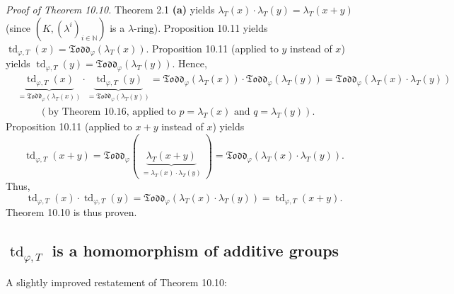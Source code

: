 \documentclass[numbers=enddot,12pt,final,onecolumn,notitlepage]{scrartcl}%
\begin{document}
\textit{Proof of Theorem 10.10.} Theorem 2.1 \textbf{(a)} yields $\lambda
_{T}\left(  x\right)  \cdot\lambda_{T}\left(  y\right)  =\lambda_{T}\left(
x+y\right)  $ (since $\left(  K,\left(  \lambda^{i}\right)  _{i\in\mathbb{N}%
}\right)  $ is a $\lambda$-ring). Proposition 10.11 yields $\operatorname*{td}%
_{\varphi,T}\left(  x\right)  =\mathfrak{Todd}_{\varphi}\left(  \lambda
_{T}\left(  x\right)  \right)  $. Proposition 10.11 (applied to $y$ instead of
$x$) yields $\operatorname*{td}_{\varphi,T}\left(  y\right)  =\mathfrak{Todd}%
_{\varphi}\left(  \lambda_{T}\left(  y\right)  \right)  $. Hence,%
\begin{align*}
&  \underbrace{\operatorname*{td}\nolimits_{\varphi,T}\left(  x\right)
}_{=\mathfrak{Todd}_{\varphi}\left(  \lambda_{T}\left(  x\right)  \right)
}\cdot\underbrace{\operatorname*{td}\nolimits_{\varphi,T}\left(  y\right)
}_{=\mathfrak{Todd}_{\varphi}\left(  \lambda_{T}\left(  y\right)  \right)
}=\mathfrak{Todd}_{\varphi}\left(  \lambda_{T}\left(  x\right)  \right)
\cdot\mathfrak{Todd}_{\varphi}\left(  \lambda_{T}\left(  y\right)  \right)
=\mathfrak{Todd}_{\varphi}\left(  \lambda_{T}\left(  x\right)  \cdot
\lambda_{T}\left(  y\right)  \right) \\
&  \ \ \ \ \ \ \ \ \ \ \left(  \text{by Theorem 10.16, applied to }%
p=\lambda_{T}\left(  x\right)  \text{ and }q=\lambda_{T}\left(  y\right)
\right)  .
\end{align*}
Proposition 10.11 (applied to $x+y$ instead of $x$) yields%
\[
\operatorname*{td}\nolimits_{\varphi,T}\left(  x+y\right)  =\mathfrak{Todd}%
_{\varphi}\left(  \underbrace{\lambda_{T}\left(  x+y\right)  }%
_{\substack{=\lambda_{T}\left(  x\right)  \cdot\lambda_{T}\left(  y\right)
}}\right)  =\mathfrak{Todd}_{\varphi}\left(  \lambda_{T}\left(  x\right)
\cdot\lambda_{T}\left(  y\right)  \right)  .
\]
Thus,%
\[
\operatorname*{td}\nolimits_{\varphi,T}\left(  x\right)  \cdot
\operatorname*{td}\nolimits_{\varphi,T}\left(  y\right)  =\mathfrak{Todd}%
_{\varphi}\left(  \lambda_{T}\left(  x\right)  \cdot\lambda_{T}\left(
y\right)  \right)  =\operatorname*{td}\nolimits_{\varphi,T}\left(  x+y\right)
.
\]
Theorem 10.10 is thus proven.

\subsection{ $\operatorname*{td}_{\varphi,T}$ is a homomorphism of additive
groups}

A slightly improved restatement of Theorem 10.10:
\end{document}
